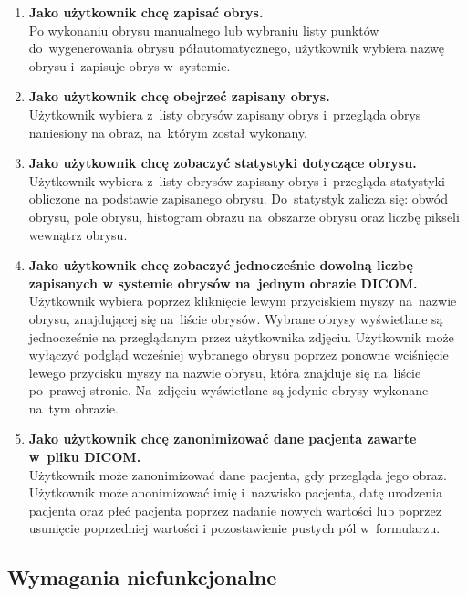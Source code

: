 \documentclass[a4paper,11pt,twoside,openright]{report}
\theoremstyle{definition}
\begin{document}
\begin{enumerate}
\item \textbf {Jako użytkownik chcę zapisać obrys.} \\
Po wykonaniu obrysu manualnego lub wybraniu listy punktów do~wygenerowania obrysu
półautomatycznego, użytkownik wybiera nazwę obrysu i~zapisuje obrys w~systemie.

\item \textbf {Jako użytkownik chcę obejrzeć zapisany obrys.} \\
Użytkownik wybiera z~listy obrysów zapisany obrys i~przegląda obrys naniesiony
na obraz, na~którym został wykonany.

\item \textbf {Jako użytkownik chcę zobaczyć statystyki dotyczące obrysu.} \\
Użytkownik wybiera z~listy obrysów zapisany obrys i~przegląda statystyki obliczone
na podstawie zapisanego obrysu. Do~statystyk zalicza się: obwód obrysu, pole obrysu,
histogram obrazu na~obszarze obrysu oraz liczbę pikseli wewnątrz obrysu.

\item \textbf {Jako użytkownik chcę zobaczyć jednocześnie dowolną liczbę zapisanych
w systemie obrysów na~jednym obrazie DICOM.} \\
Użytkownik wybiera poprzez kliknięcie lewym przyciskiem myszy na~nazwie obrysu,
znajdującej się na~liście obrysów. Wybrane obrysy wyświetlane są jednocześnie
na przeglądanym przez użytkownika zdjęciu. Użytkownik może wyłączyć podgląd
wcześniej wybranego obrysu poprzez ponowne wciśnięcie lewego przycisku myszy
na nazwie obrysu, która znajduje się na~liście po~prawej stronie. Na~zdjęciu wyświetlane są jedynie
obrysy wykonane na~tym obrazie.

\item \textbf {Jako użytkownik chcę zanonimizować dane pacjenta zawarte w~pliku DICOM.} \\
Użytkownik może zanonimizować dane pacjenta, gdy przegląda jego obraz. Użytkownik może
anonimizować imię i~nazwisko pacjenta, datę urodzenia pacjenta oraz płeć pacjenta
poprzez nadanie nowych wartości lub poprzez usunięcie poprzedniej wartości i
pozostawienie pustych pól w~formularzu.

\end{enumerate}

\subsection {Wymagania niefunkcjonalne}
\end{document}
